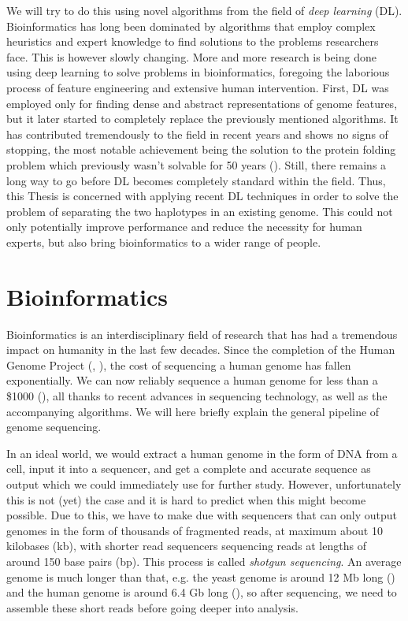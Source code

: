 \documentclass[times, utf8, diplomski, english]{fer_eng}
\begin{document}
We will try to do this using novel algorithms from the field of \textit{deep learning} (DL). Bioinformatics has long been dominated by algorithms that employ complex heuristics and expert knowledge to find solutions to the problems researchers face. This is however slowly changing. More and more research is being done using deep learning to solve problems in bioinformatics, foregoing the laborious process of feature engineering and extensive human intervention. First, DL was employed only for finding dense and abstract representations of genome features, but it later started to completely replace the previously mentioned algorithms. It has contributed tremendously to the field in recent years and shows no signs of stopping, the most notable achievement being the solution to the protein folding problem which previously wasn't solvable for 50 years (\cite{alphafold}). Still, there remains a long way to go before DL becomes completely standard within the field. Thus, this Thesis is concerned with applying recent DL techniques in order to solve the problem of separating the two haplotypes in an existing genome. This could not only potentially improve performance and reduce the necessity for human experts, but also bring bioinformatics to a wider range of people.

\section{Bioinformatics}

Bioinformatics is an interdisciplinary field of research that has had a tremendous impact on humanity in the last few decades. Since the completion of the Human Genome Project (\cite{HGP1}, \cite{HGP2}), the cost of sequencing a human genome has fallen exponentially. We can now reliably sequence a human genome for less than a \$1000 (\cite{genome_cost}), all thanks to recent advances in sequencing technology, as well as the accompanying algorithms. We will here briefly explain the general pipeline of genome sequencing.

In an ideal world, we would extract a human genome in the form of DNA from a cell, input it into a sequencer, and get a complete and accurate sequence as output which we could immediately use for further study. However, unfortunately this is not (yet) the case and it is hard to predict when this might become possible. Due to this, we have to make due with sequencers that can only output genomes in the form of thousands of fragmented reads, at maximum about 10 kilobases (kb), with shorter read sequencers sequencing reads at lengths of around 150 base pairs (bp). This process is called \textit{shotgun sequencing}. An average genome is much longer than that, e.g. the yeast genome is around 12 Mb long (\cite{yeast}) and the human genome is around 6.4 Gb long (\cite{human}), so after sequencing, we need to assemble these short reads before going deeper into analysis.
\end{document}

